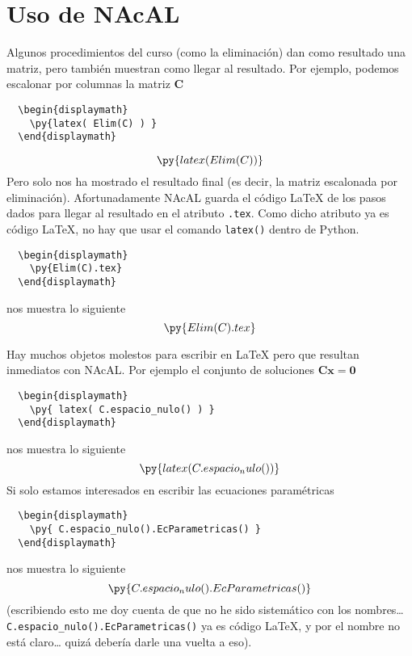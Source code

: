 \documentclass[12pt,a4paper]{article} %
\begin{document}
\section{Uso de NAcAL}
Algunos procedimientos del curso (como la eliminación) dan como
resultado una matriz, pero también muestran como llegar al
resultado. Por ejemplo, podemos escalonar por columnas la matriz
$\mathbf{C}$
\begin{Verbatim}
  \begin{displaymath}
    \py{latex( Elim(C) ) }
  \end{displaymath}
\end{Verbatim}
\begin{displaymath}
  \py{latex( Elim(C) ) }
\end{displaymath}
Pero solo nos ha mostrado el resultado final (es decir, la matriz
escalonada por eliminación). Afortunadamente NAcAL guarda el código
\LaTeX{} de los pasos dados para llegar al resultado en el atributo
\texttt{.tex}. Como dicho atributo ya es código \LaTeX{}, no hay que
usar el comando \texttt{latex()} dentro de Python.
\begin{Verbatim}
  \begin{displaymath}
    \py{Elim(C).tex}
  \end{displaymath}
\end{Verbatim}
nos muestra lo siguiente
\begin{displaymath}
  \py{Elim(C).tex}
\end{displaymath}

Hay muchos objetos molestos para escribir en \LaTeX{} pero que
resultan inmediatos con NAcAL. Por ejemplo el conjunto de soluciones
$\mathbf{C}\boldsymbol{x}=\boldsymbol{0}$
\begin{Verbatim}
  \begin{displaymath}
    \py{ latex( C.espacio_nulo() ) }
  \end{displaymath}
\end{Verbatim}
nos muestra lo siguiente
\begin{displaymath}
  \py{latex(C.espacio_nulo())}
\end{displaymath}
Si solo estamos interesados en escribir las ecuaciones paramétricas
\begin{Verbatim}
  \begin{displaymath}
    \py{ C.espacio_nulo().EcParametricas() }
  \end{displaymath}
\end{Verbatim}
nos muestra lo siguiente
\begin{displaymath}
  \py{C.espacio_nulo().EcParametricas()}
\end{displaymath}
\DefineShortVerb{\|}
(escribiendo esto me doy cuenta de que no he sido sistemático con los
nombres\ldots{} \Verb+C.espacio_nulo().EcParametricas()+ ya es código
\LaTeX{}, y por el nombre no está claro\dots{} quizá debería darle una
vuelta a eso).  \medskip
\end{document}
